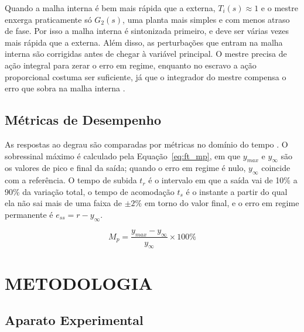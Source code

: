 \documentclass[a4paper,12pt]{article}
\begin{document}
\begin{justify}
    \hspace{4ex}Quando a malha interna é bem mais rápida que a externa, $T_i(s) \approx 1$ e o mestre enxerga praticamente só $G_2(s)$, uma planta mais simples e com menos atraso de fase. Por isso a malha interna é sintonizada primeiro, e deve ser várias vezes mais rápida que a externa. Além disso, as perturbações que entram na malha interna são corrigidas antes de chegar à variável principal. O mestre precisa de ação integral para zerar o erro em regime, enquanto no escravo a ação proporcional costuma ser suficiente, já que o integrador do mestre compensa o erro que sobra na malha interna \cite{seborg2011}.
\end{justify}

\subsection{Métricas de Desempenho}

\begin{justify}
    \hspace{4ex}As respostas ao degrau são comparadas por métricas no domínio do tempo \cite{ogata2010}. O sobressinal máximo é calculado pela Equação~\eqref{eq:ft_mp}, em que $y_{max}$ e $y_\infty$ são os valores de pico e final da saída; quando o erro em regime é nulo, $y_\infty$ coincide com a referência. O tempo de subida $t_r$ é o intervalo em que a saída vai de 10\% a 90\% da variação total, o tempo de acomodação $t_s$ é o instante a partir do qual ela não sai mais de uma faixa de $\pm 2\%$ em torno do valor final, e o erro em regime permanente é $e_{ss} = r - y_\infty$.
\end{justify}

\begin{equation}
    M_p = \frac{y_{max} - y_\infty}{y_\infty} \times 100\%
    \label{eq:ft_mp}
\end{equation}

\newpage


\thispagestyle{main}

\section{METODOLOGIA}

\subsection{Aparato Experimental}
\end{document}
